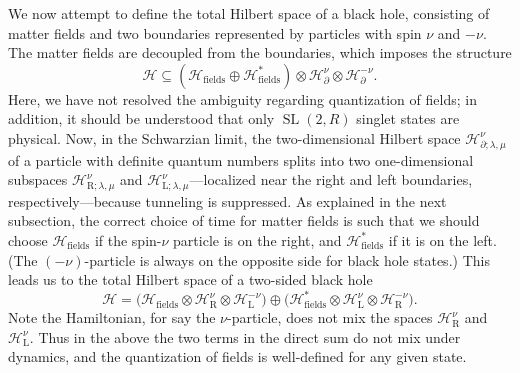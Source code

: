 \documentclass[11pt]{article}
\newcommand{\be}{\begin{equation}}
\newcommand{\ee}{\end{equation}}
\newcommand{\calH}{\mathcal{H}}
\newcommand{\RR}{\mathbb{R}}
\DeclareMathOperator{\tSL}{\widetilde{\mathrm{SL}}}
\newcommand{\la}{\text{L}}
\newcommand{\ra}{\text{R}}
\newcommand{\p}{\partial}
\def\widetilde#1{#1}%
\def\RR{R}
\begin{document}
We now attempt to define the total Hilbert space of a black hole, consisting of matter fields and two boundaries represented by particles with spin $\nu$ and $-\nu$. The matter fields are decoupled from the boundaries, which imposes the structure
\be \label{HS_gen}
\calH \subseteq (\calH_{\text{fields}} \oplus \calH_{\text{fields}}^*)\otimes\calH^{\nu}_{\p}\otimes\calH^{-\nu}_{\p}.
\ee
Here, we have not resolved the ambiguity regarding quantization of fields; in addition, it should be understood that only $\tSL(2,\RR)$ singlet states are physical. Now, in the Schwarzian limit, the two-dimensional Hilbert space $\calH^{\nu}_{\p;\lambda,\mu}$ of a particle with definite quantum numbers splits into two one-dimensional subspaces $\calH^{\nu}_{\ra;\lambda,\mu}$ and $\calH^{\nu}_{\la;\lambda,\mu}$---localized near the right and left boundaries, respectively---because tunneling is suppressed. As explained in the next subsection, the correct choice of time for matter fields is such that we should choose $\calH_{\text{fields}}$ if the spin-$\nu$ particle is on the right, and $\calH_{\text{fields}}^*$ if it is on the left. (The $(-\nu)$-particle is always on the opposite side for black hole states.) This leads us to the total Hilbert space of a two-sided black hole
\begin{equation}\label{HS_fRL}
\calH = \bigl(\calH_{\text{fields}}
\otimes\calH^{\nu}_{\ra}\otimes\calH^{-\nu}_{\la}\bigr)
\oplus\bigl(\calH_{\text{fields}}^*
\otimes\calH^{\nu}_{\la}\otimes\calH^{-\nu}_{\ra}\bigr).
\end{equation}
Note the Hamiltonian, for say the $\nu$-particle, does not mix the spaces $\calH^{\nu}_{\ra}$ and $\calH^{\nu}_{\la}$. Thus in the above the two terms in the direct sum do not mix under dynamics, and the quantization of fields is well-defined for any given state.
\end{document}
